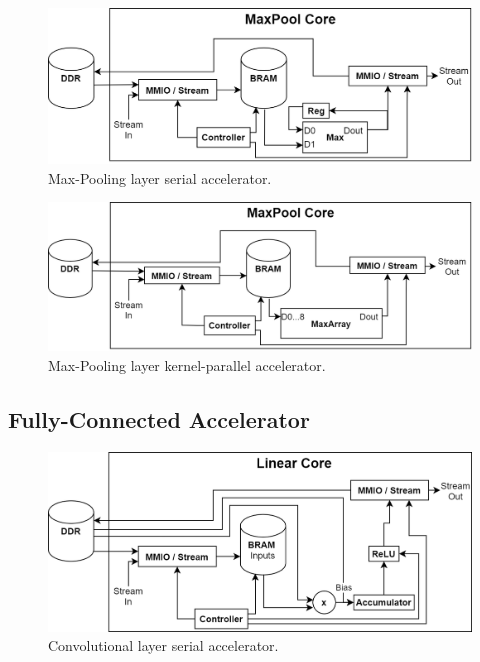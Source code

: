 \begin{figure} [H]
	\centering
	\includegraphics[width=\textwidth]{Images/Platform/MaxPool_core_serial.png}
	\decoRule
	\caption[Max-Pooling layer serial accelerator]{Max-Pooling layer serial accelerator.}
	\label{fig:max-pool-core-serial}
\end{figure}

\begin{figure} [H]
	\centering
	\includegraphics[width=\textwidth]{Images/Platform/MaxPool_core_kernel_parallel.png}
	\decoRule
	\caption[Max-Pooling layer kernel-parallel accelerator]{Max-Pooling layer kernel-parallel accelerator.}
	\label{fig:max-pool-core-kernel-parallel}
\end{figure}

\subsection{Fully-Connected Accelerator}

\begin{figure} [H]
	\centering
	\includegraphics[width=\textwidth]{Images/Platform/Linear_core_serial.png}
	\decoRule
	\caption[Convolutional layer serial accelerator]{Convolutional layer serial accelerator.}
	\label{fig:linear-core-serial}
\end{figure}

